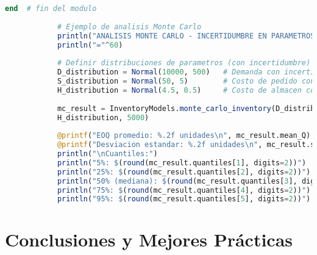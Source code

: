 \documentclass[12pt,a4paper]{book}
\begin{document}
\begin{tcolorbox}[enhanced,colback=grisclaro,colframe=grisoScuro,boxrule=2pt,arc=8pt,
		title={\bfseries\color{white} \faTools\ HERRAMIENTAS ADICIONALES},breakable]
\begin{lstlisting}[language=Julia,basicstyle=\footnotesize\ttfamily]
			end  # fin del modulo
			
			# Ejemplo de analisis Monte Carlo
			println("ANALISIS MONTE CARLO - INCERTIDUMBRE EN PARAMETROS")
			println("="^60)
			
			# Definir distribuciones de parametros (con incertidumbre)
			D_distribution = Normal(10000, 500)   # Demanda con incertidumbre
			S_distribution = Normal(50, 5)        # Costo de pedido con incertidumbre  
			H_distribution = Normal(4.5, 0.5)     # Costo de almacen con incertidumbre
			
			mc_result = InventoryModels.monte_carlo_inventory(D_distribution, S_distribution, 
			H_distribution, 5000)
			
			@printf("EOQ promedio: %.2f unidades\n", mc_result.mean_Q)
			@printf("Desviacion estandar: %.2f unidades\n", mc_result.std_Q)
			println("\nCuantiles:")
			println("5%: $(round(mc_result.quantiles[1], digits=2))")
			println("25%: $(round(mc_result.quantiles[2], digits=2))")
			println("50% (mediana): $(round(mc_result.quantiles[3], digits=2))")
			println("75%: $(round(mc_result.quantiles[4], digits=2))")
			println("95%: $(round(mc_result.quantiles[5], digits=2))")
		\end{lstlisting}
		
	\end{tcolorbox}
	
	\section{Conclusiones y Mejores Pr\'acticas}
	
\end{document}
